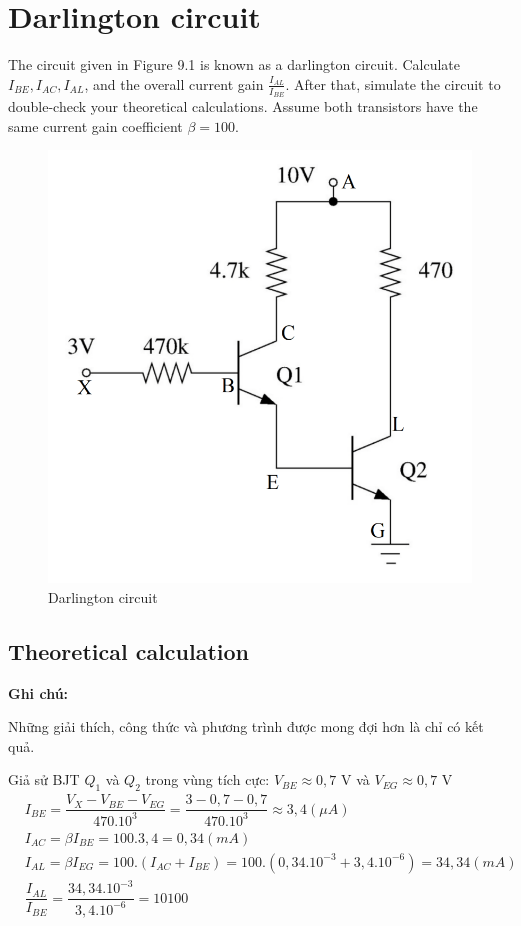 \section{Darlington circuit}
The circuit given in Figure 9.1 is known as a darlington circuit. Calculate \(I_{BE} , I_{AC} , I_{AL}\),
and the overall current gain \(\frac{I_{AL}}{I_{BE}}\). After that, simulate the circuit to double-check your
theoretical calculations. Assume both transistors have the same current gain coefficient
\(\beta = 100.\)
\begin{figure}[ht]
    \centering
    \includegraphics[scale=0.4]{graphics/ex9/f1.png}
    \caption{Darlington circuit}
\end{figure}
\subsection{Theoretical calculation}
\textbf{Ghi chú:}

Những giải thích, công thức và phương trình được mong đợi hơn là chỉ có kết quả.

Giả sử BJT \(Q_1\) và \(Q_2\) trong vùng tích cực: \(V_{BE} \approx 0,7 \) V và \(V_{EG} \approx 0,7\) V
    \begin{align*}
    &I_{BE}=\dfrac{V_X - V_{BE} - V_{EG}}{470.10^3} = \dfrac{3 - 0,7 - 0,7}{470.10^3} \approx 3,4 (\mu A) \\
    &I_{AC} = \beta I_{BE} = 100.3,4 = 0,34 (mA)\\
    &I_{AL} = \beta I_{EG} = 100.(I_{AC} + I_{BE}) = 100.(0,34.10^{-3} + 3,4.10^{-6}) = 34,34 (mA)\\
    &\dfrac{I_{AL}}{I_{BE}} = \dfrac{34,34.10^{-3}}{3,4.10^{-6}} = 10100\\
    \end{align*}
    \newpage
